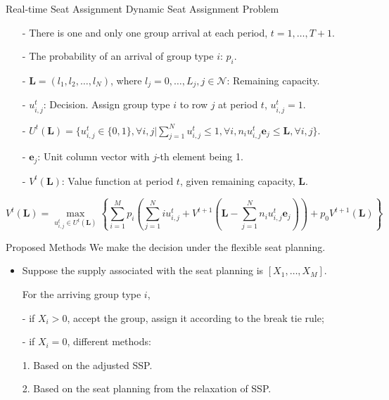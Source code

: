   \begin{frame}{Real-time Seat Assignment}
    \centering
    Dynamic Seat Assignment Problem
    \small
    \begin{itemize}
    \item[-] There is one and only one group arrival at each period, $t = 1, \ldots, T+1$. 
    \item[-] The probability of an arrival of group type $i$: $p_i$.
    \item[-] $\mathbf{L} = (l_1, l_2, \ldots, l_{N})$, where $l_j =0,\ldots, L_j, j\in \mathcal{N}$: Remaining capacity.
    \item[-] $u_{i,j}^{t}$: Decision. Assign group type $i$ to row $j$ at period $t$, $u_{i,j}^t =1$.
    \item[-] $U^{t}(\mathbf{L}) = \{u_{i,j}^{t} \in\{0,1\}, \forall i,j| \sum_{j=1}^{N} u_{i,j}^{t} \leq 1, \forall i, n_{i}u_{i,j}^{t}\mathbf{e}_j \leq \mathbf{L}, \forall i,j \}$.
    \item[-] $\mathbf{e}_j$: Unit column vector with $j$-th element being 1.
    \item[-] $V^{t}(\mathbf{L})$: Value function at period $t$, given remaining capacity, $\mathbf{L}$.
    \end{itemize}

    $$V^{t}(\mathbf{L}) = \max_{u_{i,j}^{t} \in U^{t}(\mathbf{L})}\left\{ \sum_{i=1}^{M} p_i ( \sum_{j=1}^{N} i u_{i,j}^{t} + V^{t+1}(\mathbf{L}- \sum_{j=1}^{N} n_i u_{i,j}^{t}\mathbf{e}_j)) + p_0 V^{t+1}(\mathbf{L})\right\}$$
    \small
\end{frame}

  \begin{frame}{Proposed Methods}
    We make the decision under the flexible seat planning.

    \begin{itemize}
      \item Suppose the supply associated with the seat planning is $[X_{1}, \ldots, X_M]$.
      
      \vspace{0.5cm}

      For the arriving group type $i$,

      \item[-] if $X_i > 0$, accept the group, assign it according to the break tie rule;
      
      \item[-] if $X_i = 0$, different methods:
      
      \vspace{0.5cm}

      1. Based on the adjusted SSP.

      2. Based on the seat planning from the relaxation of SSP.

    \end{itemize}
  \end{frame}


